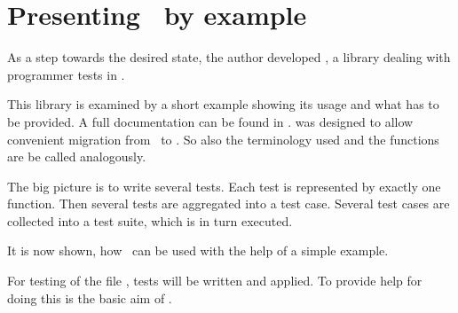 %                                                                        
%                                                                        
%                                                                        
%                                                                        
%
\clearpage
\section{Presenting \projectplainname~by example}

As a step towards the desired state, the author developed \projectname, a library dealing with programmer tests in \Aldor. 

This library is examined by a short example showing its usage and what has to be provided. A full documentation can be found in . \projectname was designed to allow convenient migration from \JUnit~to \projectname.
So also the terminology used and the functions are be called analogously.

The big picture is to write several tests. Each test is represented by exactly one function. Then several tests are aggregated into a test case. Several test cases are collected into a test suite, which is in turn executed.

It is now shown, how \projectname~can be used with the help of a simple example. 

For testing  of the file , tests will be written and applied. To provide help for doing this is the basic aim of \projectname.

